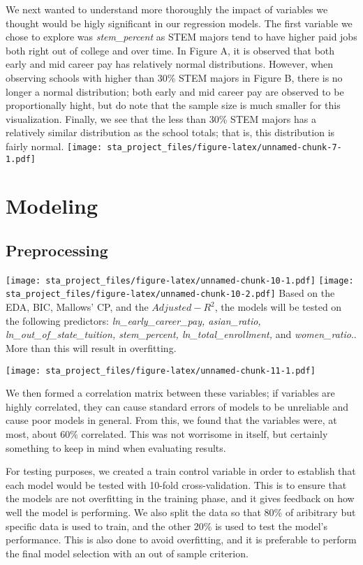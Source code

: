 \documentclass[
]{article}
\begin{document}
We next wanted to understand more thoroughly the impact of variables we
thought would be higly significant in our regression models. The first
variable we chose to explore was \emph{stem\_percent} as STEM majors
tend to have higher paid jobs both right out of college and over time.
In Figure A, it is observed that both early and mid career pay has
relatively normal distributions. However, when observing schools with
higher than 30\% STEM majors in Figure B, there is no longer a normal
distribution; both early and mid career pay are observed to be
proportionally hight, but do note that the sample size is much smaller
for this visualization. Finally, we see that the less than 30\% STEM
majors has a relatively similar distribution as the school totals; that
is, this distribution is fairly normal.
\texttt{[image: sta\_project\_files/figure-latex/unnamed-chunk-7-1.pdf]}

\hypertarget{modeling}{%
\section{Modeling}\label{modeling}}

\hypertarget{preprocessing}{%
\subsection{Preprocessing}\label{preprocessing}}

\texttt{[image: sta\_project\_files/figure-latex/unnamed-chunk-10-1.pdf]}
\texttt{[image: sta\_project\_files/figure-latex/unnamed-chunk-10-2.pdf]}
Based on the EDA, BIC, Mallows' CP, and the \(Adjusted-R^2\), the models
will be tested on the following predictors:
\emph{ln\_early\_career\_pay, asian\_ratio, ln\_out\_of\_state\_tuition,
stem\_percent, ln\_total\_enrollment,} and \emph{women\_ratio}.. More
than this will result in overfitting.

\texttt{[image: sta\_project\_files/figure-latex/unnamed-chunk-11-1.pdf]}

We then formed a correlation matrix between these variables; if
variables are highly correlated, they can cause standard errors of
models to be unreliable and cause poor models in general. From this, we
found that the variables were, at most, about 60\% correlated. This was
not worrisome in itself, but certainly something to keep in mind when
evaluating results.

For testing purposes, we created a train control variable in order to
establish that each model would be tested with 10-fold cross-validation.
This is to ensure that the models are not overfitting in the training
phase, and it gives feedback on how well the model is performing. We
also split the data so that 80\% of aribitrary but specific data is used
to train, and the other 20\% is used to test the model's performance.
This is also done to avoid overfitting, and it is preferable to perform
the final model selection with an out of sample criterion.
\end{document}
